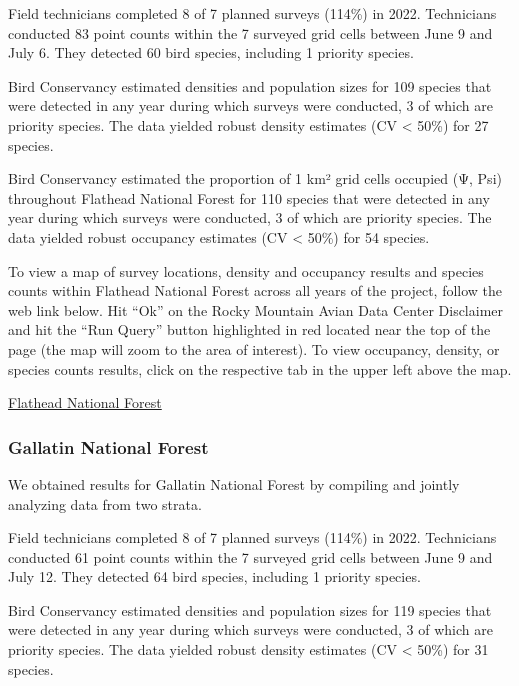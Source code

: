 \documentclass[
  letterpaper,
  DIV=11,
  numbers=noendperiod,
  oneside]{scrreprt}
\begin{document}
Field technicians completed 8 of 7 planned surveys (114\%) in 2022.
Technicians conducted 83 point counts within the 7 surveyed grid cells
between June 9 and July 6. They detected 60 bird species, including 1
priority species.

Bird Conservancy estimated densities and population sizes for 109
species that were detected in any year during which surveys were
conducted, 3 of which are priority species. The data yielded robust
density estimates (CV \textless{} 50\%) for 27 species.

Bird Conservancy estimated the proportion of 1 km² grid cells occupied
(Ψ, Psi) throughout Flathead National Forest for 110 species that were
detected in any year during which surveys were conducted, 3 of which are
priority species. The data yielded robust occupancy estimates (CV
\textless{} 50\%) for 54 species.

To view a map of survey locations, density and occupancy results and
species counts within Flathead National Forest across all years of the
project, follow the web link below. Hit ``Ok'' on the Rocky Mountain
Avian Data Center Disclaimer and hit the ``Run Query'' button
highlighted in red located near the top of the page (the map will zoom
to the area of interest). To view occupancy, density, or species counts
results, click on the respective tab in the upper left above the map.

\href{http://www.rmbo.org/new_site/adc/QueryWindow.aspx\#N4IgzgrgDgpgTmALnAhoiBbEAuABCAMQBs0ALGFAE1wDk0BLAewDsUjcDG4YkQBfIA==}{Flathead
National Forest}

\hypertarget{gallatin-national-forest}{%
\subsubsection{Gallatin National
Forest}\label{gallatin-national-forest}}

We obtained results for Gallatin National Forest by compiling and
jointly analyzing data from two strata.

Field technicians completed 8 of 7 planned surveys (114\%) in 2022.
Technicians conducted 61 point counts within the 7 surveyed grid cells
between June 9 and July 12. They detected 64 bird species, including 1
priority species.

Bird Conservancy estimated densities and population sizes for 119
species that were detected in any year during which surveys were
conducted, 3 of which are priority species. The data yielded robust
density estimates (CV \textless{} 50\%) for 31 species.
\end{document}
